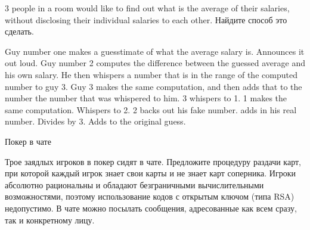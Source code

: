 \begin{problem}
  3 people in a room would like
to find out what is the average of their salaries, without disclosing
their individual salaries to each other. Найдите способ это сделать.



\begin{sol}

Guy number one makes a guesstimate of what the average salary is. Announces it out loud.
Guy number 2 computes the difference between the guessed average and his own salary. He then whispers a number that is in the range of the computed number to guy 3. Guy 3 makes the same computation, and then adds that to the number the number that was whispered to him. 3 whispers to 1. 1 makes the same computation. Whispers to 2. 2 backs out his fake number. adds in his real number. Divides by 3. Adds to the original guess.
\end{sol}
\end{problem}



\begin{problem}
 Покер в чате \par
Трое заядлых игроков в покер сидят в чате. Предложите процедуру раздачи карт, при которой каждый игрок знает свои карты и не знает карт соперника. Игроки абсолютно рациональны и обладают безграничными вычислительными возможностями, поэтому использование кодов с открытым ключом (типа RSA) недопустимо. В чате можно посылать сообщения, адресованные как всем сразу, так и конкретному лицу.\par



\begin{sol}

\end{sol}
\end{problem}




